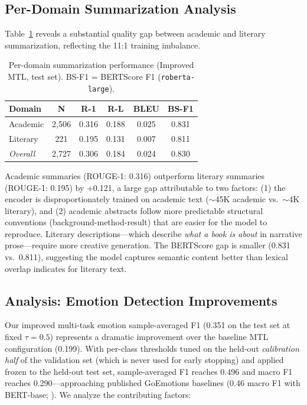\documentclass[11pt]{article}
\begin{document}
\subsection{Per-Domain Summarization Analysis}

Table~\ref{tab:domain_breakdown} reveals a substantial quality gap between academic and literary summarization, reflecting the 11:1 training imbalance.

\begin{table}[t]
\centering
\caption{Per-domain summarization performance (Improved MTL, test set). BS-F1 = BERTScore F1 (\texttt{roberta-large}).}
\label{tab:domain_breakdown}
\small
\setlength{\tabcolsep}{2pt}
\begin{tabular}{lccccc}
\toprule
\textbf{Domain} & \textbf{N} & \textbf{R-1} & \textbf{R-L} & \textbf{BLEU} & \textbf{BS-F1} \\
\midrule
Academic & 2,506 & 0.316 & 0.188 & 0.025 & 0.831 \\
Literary & 221 & 0.195 & 0.131 & 0.007 & 0.811 \\
\midrule
\textit{Overall} & 2,727 & 0.306 & 0.184 & 0.024 & 0.830 \\
\bottomrule
\end{tabular}
\end{table}

Academic summaries (ROUGE-1: 0.316) outperform literary summaries (ROUGE-1: 0.195) by +0.121, a large gap attributable to two factors: (1) the encoder is disproportionately trained on academic text ($\sim$45K academic vs.\ $\sim$4K literary), and (2) academic abstracts follow more predictable structural conventions (background-method-result) that are easier for the model to reproduce. Literary descriptions---which describe \textit{what a book is about} in narrative prose---require more creative generation. The BERTScore gap is smaller (0.831 vs.\ 0.811), suggesting the model captures semantic content better than lexical overlap indicates for literary text.

\subsection{Analysis: Emotion Detection Improvements}
\label{sec:emotion_analysis}

Our improved multi-task emotion sample-averaged F1 (0.351 on the test set at fixed $\tau=0.5$) represents a dramatic improvement over the baseline MTL configuration (0.199). With per-class thresholds tuned on the held-out \emph{calibration half} of the validation set (which is never used for early stopping) and applied frozen to the held-out test set, sample-averaged F1 reaches 0.496 and macro F1 reaches 0.290---approaching published GoEmotions baselines (0.46 macro F1 with BERT-base; \citealp{demszky2020goemotions}). We analyze the contributing factors:
\end{document}
